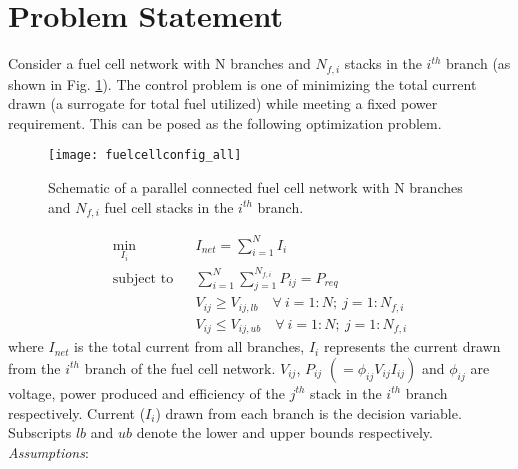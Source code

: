 \documentclass[twocolumn]{autart}
\begin{document}
\section{Problem Statement} Consider a fuel cell network with N branches and $N_{f,i}$ stacks in the $i^{th}$ branch (as shown in Fig. \ref{fuelcellconfig_all}). The control problem is one of minimizing the total current drawn (a surrogate for total fuel utilized) while meeting a fixed power requirement. This can be posed as the following optimization problem.
\begin{figure}[htbp]
\centering
\texttt{[image: fuelcellconfig\_all]}
\caption{Schematic of a parallel connected fuel cell network with N branches and $N_{f,i}$ fuel cell stacks in the $i^{th}$ branch.}
\label{fuelcellconfig_all}
\end{figure}
\begin{subequations}
\label{genrl_optimeqn}
\begin{align}
& \underset{I_{i}}{\text{min}}
& & I_{net} = \sum_{i=1}^{N}I_{i} \\
& \text{subject to} & &  \sum_{i=1}^{N}\sum_{j=1}^{N_{f,i}} P_{ij} = P_{req} \\
& & &  V_{ij} \geq V_{ij,lb} \quad \forall \ i=1:N; \ j=1:N_{f,i} & \\
& & &  V_{ij} \leq V_{ij,ub} \quad\forall \ i=1:N; \ j=1:N_{f,i} &   
\end{align}
\end{subequations} 
where $I_{net}$ is the total current from all branches, $I_{i}$ represents the current drawn from the $i^{th}$ branch of the fuel cell network. $V_{ij}$, $P_{ij}$ $\left(= \phi_{ij}V_{ij}I_{ij}\right)$ and $\phi_{ij}$ are voltage, power produced and efficiency of the $j^{th}$ stack in the $i^{th}$ branch respectively. Current ($I_i$) drawn from each branch is the decision variable. Subscripts $lb$ and $ub$ denote the lower and upper bounds respectively. 
\vskip-0.1in
\textit{Assumptions}:
\end{document}
